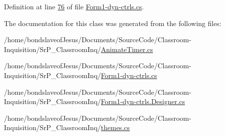 \-Definition at line \hyperlink{_form1-dyn-ctrls_8cs_source_l00076}{76} of file \hyperlink{_form1-dyn-ctrls_8cs_source}{\-Form1-\/dyn-\/ctrls.\-cs}.



\-The documentation for this class was generated from the following files\-:\begin{DoxyCompactItemize}
\item 
/home/bondslaveof\-Jesus/\-Documents/\-Source\-Code/\-Classroom-\/\-Inquisition/\-Sr\-P\-\_\-\-Classroom\-Inq/\hyperlink{_animate_timer_8cs}{\-Animate\-Timer.\-cs}\item 
/home/bondslaveof\-Jesus/\-Documents/\-Source\-Code/\-Classroom-\/\-Inquisition/\-Sr\-P\-\_\-\-Classroom\-Inq/\hyperlink{_form1-dyn-ctrls_8cs}{\-Form1-\/dyn-\/ctrls.\-cs}\item 
/home/bondslaveof\-Jesus/\-Documents/\-Source\-Code/\-Classroom-\/\-Inquisition/\-Sr\-P\-\_\-\-Classroom\-Inq/\hyperlink{_form1-dyn-ctrls_8_designer_8cs}{\-Form1-\/dyn-\/ctrls.\-Designer.\-cs}\item 
/home/bondslaveof\-Jesus/\-Documents/\-Source\-Code/\-Classroom-\/\-Inquisition/\-Sr\-P\-\_\-\-Classroom\-Inq/\hyperlink{themes_8cs}{themes.\-cs}\end{DoxyCompactItemize}
